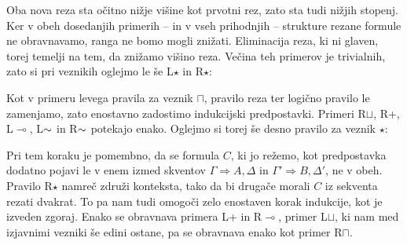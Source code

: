 Oba nova reza sta očitno nižje višine kot prvotni rez, zato sta tudi nižjih stopenj. Ker v obeh dosedanjih primerih -- in v vseh prihodnjih -- strukture rezane formule ne obravnavamo, ranga ne bomo mogli znižati. Eliminacija reza, ki ni glaven, torej temelji na tem, da znižamo višino reza. Večina teh primerov je trivialnih, zato si pri veznikih oglejmo le še L$\star$ in R$\star$:
\begin{prooftree}

\end{prooftree}
\dol
\begin{prooftree}

\end{prooftree}
Kot v primeru levega pravila za veznik $\sqcap$, pravilo reza ter logično pravilo le zamenjamo, zato enostavno zadostimo indukcijski predpostavki. Primeri R$\sqcup$, R+, L$\multimap$, L$\negacija$ in R$\negacija$ potekajo enako. Oglejmo si torej še desno pravilo za veznik $\star$:
\begin{prooftree}

\end{prooftree}
\dol
\begin{prooftree}

\end{prooftree}
Pri tem koraku je pomembno, da se formula $C$, ki jo režemo, kot predpostavka dodatno pojavi le v enem izmed skventov $\Gamma \Rightarrow A,\Delta$ in $\Gamma' \Rightarrow B,\Delta'$, ne v obeh. Pravilo R$\star$ namreč združi konteksta, tako da bi drugače morali $C$ iz sekventa rezati dvakrat. To pa nam tudi omogoči zelo enostaven korak indukcije, kot je izveden zgoraj. Enako se obravnava primera L+ in R$\multimap$, primer L$\sqcup$, ki nam med izjavnimi vezniki še edini ostane, pa se obravnava enako kot primer R$\sqcap$.

